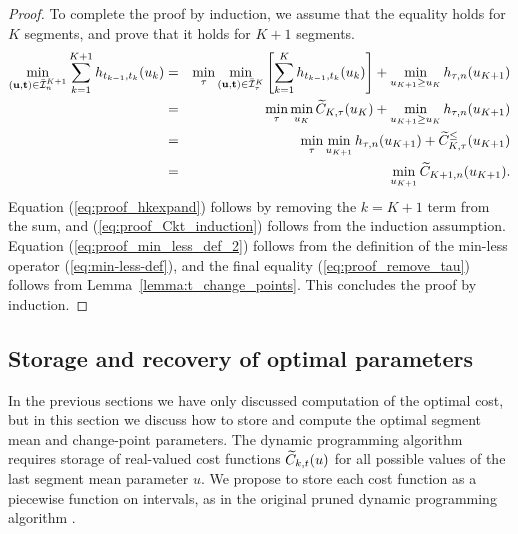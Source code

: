 \documentclass{article}
\begin{document}
\begin{proof}
To complete the proof by induction, we assume that the equality holds for
$K$ segments, and prove that it holds for $K+1$ segments.
\begin{eqnarray}
  \label{eq:proof_separate_tau}
  \min_{(\mathbf u, \mathbf t)\in\bar{\mathcal I}_n^{K+1}}
  \sum_{k=1}^{K+1}
  h_{t_{k-1}, t_k}(u_k)
  &= & \label{eq:proof_hkexpand}\min_\tau
  \min_{(\mathbf u, \mathbf t)\in\bar{\mathcal I}_\tau^K}
       \left[
       \sum_{k=1}^K
       h_{t_{k-1},t_k}(u_k)
       \right]
       +\min_{u_{K+1}\geq u_K}
       h_{\tau, n} (u_{K+1})\\
&=& \min_\tau\min_{u_K} \widetilde{C}_{K,\tau}(u_K)\label{eq:proof_Ckt_induction}
    +\min_{u_{K+1}\geq u_K} h_{\tau,n}(u_{K+1})\\
&=& \min_\tau \min_{u_{K+1}} h_{\tau,n}(u_{K+1})\label{eq:proof_min_less_def_2}
+\widetilde{C}_{K,\tau}^\leq(u_{K+1})\\
&=& \min_{u_{K+1}} \widetilde{C}_{K+1,n}(u_{K+1}).\label{eq:proof_remove_tau}
\end{eqnarray}
Equation (\ref{eq:proof_hkexpand}) follows by removing the $k=K+1$
term from the sum, and (\ref{eq:proof_Ckt_induction}) follows from the
induction assumption. Equation (\ref{eq:proof_min_less_def_2}) follows
from the definition of the min-less operator (\ref{eq:min-less-def}),
and the final equality (\ref{eq:proof_remove_tau}) follows from
Lemma~\ref{lemma:t_change_points}. This concludes the proof by induction.
\end{proof}

\subsection{Storage and recovery of optimal parameters}

In the previous sections we have only discussed computation of the
optimal cost, but in this section we discuss how to store and compute
the optimal segment mean and change-point parameters. The dynamic
programming algorithm requires storage of real-valued cost functions
$\widetilde{C}_{k,t}(u)$ for all possible values of the last segment mean
parameter $u$. We propose to store each cost function as a piecewise
function on intervals, as in the original pruned dynamic programming
algorithm \citep{pruned-dp}.
\end{document}
